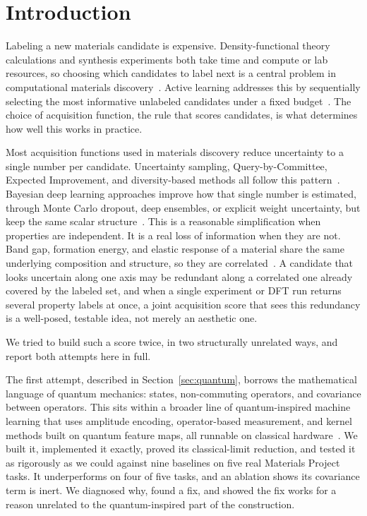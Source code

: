 \documentclass[10pt]{article}
\begin{document}
\section{Introduction}

Labeling a new materials candidate is expensive. Density-functional theory calculations and synthesis experiments both take time and compute or lab resources, so choosing which candidates to label next is a central problem in computational materials discovery~\cite{wang2023scientific,ren2018accelerated,pyzerknapp2022accelerating,huang2024machine}. Active learning addresses this by sequentially selecting the most informative unlabeled candidates under a fixed budget~\cite{settles2009active,cohn1996active,settles2012active}. The choice of acquisition function, the rule that scores candidates, is what determines how well this works in practice.

Most acquisition functions used in materials discovery reduce uncertainty to a single number per candidate. Uncertainty sampling, Query-by-Committee, Expected Improvement, and diversity-based methods all follow this pattern~\cite{sener2018active,ash2020deep,kim2021task,lookman2019active,vandermause2020fly,bulusu2022efficient}. Bayesian deep learning approaches improve how that single number is estimated, through Monte Carlo dropout, deep ensembles, or explicit weight uncertainty, but keep the same scalar structure~\cite{gal2016dropout,lakshminarayanan2017simple,blundell2015weight,snoek2012practical}. This is a reasonable simplification when properties are independent. It is a real loss of information when they are not. Band gap, formation energy, and elastic response of a material share the same underlying composition and structure, so they are correlated~\cite{jain2013materials,curtarolo2013highthroughput,noh2019inverse,ong2013python}. A candidate that looks uncertain along one axis may be redundant along a correlated one already covered by the labeled set, and when a single experiment or DFT run returns several property labels at once, a joint acquisition score that sees this redundancy is a well-posed, testable idea, not merely an aesthetic one.

We tried to build such a score twice, in two structurally unrelated ways, and report both attempts here in full.

The first attempt, described in Section~\ref{sec:quantum}, borrows the mathematical language of quantum mechanics: states, non-commuting operators, and covariance between operators. This sits within a broader line of quantum-inspired machine learning that uses amplitude encoding, operator-based measurement, and kernel methods built on quantum feature maps, all runnable on classical hardware~\cite{biamonte2017quantum,schuld2021machine,li2021quantuminspired,rebentrost2014quantum,schuld2021supervised,havlicek2019supervised}. We built it, implemented it exactly, proved its classical-limit reduction, and tested it as rigorously as we could against nine baselines on five real Materials Project tasks. It underperforms on four of five tasks, and an ablation shows its covariance term is inert. We diagnosed why, found a fix, and showed the fix works for a reason unrelated to the quantum-inspired part of the construction.
\end{document}
